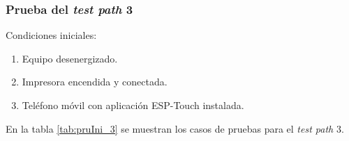 \pagebreak
\subsubsection{Prueba del \textit{test path} 3}
\label{subsubsec:pruIni_3}

Condiciones iniciales: 

\begin{enumerate}
	\item Equipo desenergizado.
	\item Impresora encendida y conectada.
	\item Teléfono móvil con aplicación ESP-Touch instalada.
\end{enumerate}

En la tabla \ref{tab:pruIni_3} se muestran los casos de pruebas para el \textit{test path} 3.

